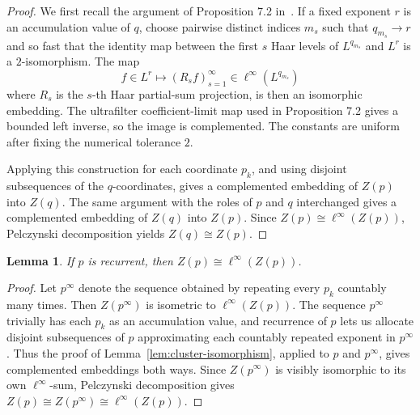\documentclass[11pt]{article}
\newtheorem{lemma}{Lemma}
\begin{document}
\begin{proof}
We first recall the argument of Proposition 7.2 in~\cite{LMMMS}.  If a fixed exponent \(r\) is an
accumulation value of \(q\), choose pairwise distinct indices \(m_s\) such that \(q_{m_s}\to r\) and
so fast that the identity map between the first \(s\) Haar levels of \(L^{q_{m_s}}\) and
\(L^r\) is a \(2\)-isomorphism.  The map
\[
  f\in L^r \longmapsto (R_s f)_{s=1}^\infty\in\ell^\infty(L^{q_{m_s}})
\]
where \(R_s\) is the \(s\)-th Haar partial-sum projection, is then an isomorphic embedding.  The
ultrafilter coefficient-limit map used in Proposition 7.2 gives a bounded left inverse, so the
image is complemented.  The constants are uniform after fixing the numerical tolerance \(2\).

Applying this construction for each coordinate \(p_k\), and using disjoint subsequences of the
\(q\)-coordinates, gives a complemented embedding of \(Z(p)\) into \(Z(q)\).  The same argument with
the roles of \(p\) and \(q\) interchanged gives a complemented embedding of \(Z(q)\) into \(Z(p)\).
Since \(Z(p)\cong\ell^\infty(Z(p))\), Pelczynski decomposition yields \(Z(q)\cong Z(p)\).
\end{proof}

\begin{lemma}
\label{lem:recurrent-accordion}
If \(p\) is recurrent, then \(Z(p)\cong\ell^\infty(Z(p))\).
\end{lemma}

\begin{proof}
Let \(p^\infty\) denote the sequence obtained by repeating every \(p_k\) countably many times.  Then
\(Z(p^\infty)\) is isometric to \(\ell^\infty(Z(p))\).  The sequence \(p^\infty\) trivially has each
\(p_k\) as an accumulation value, and recurrence of \(p\) lets us allocate disjoint subsequences of
\(p\) approximating each countably repeated exponent in \(p^\infty\).  Thus the proof of
Lemma~\ref{lem:cluster-isomorphism}, applied to \(p\) and \(p^\infty\), gives complemented
embeddings both ways.  Since \(Z(p^\infty)\) is visibly isomorphic to its own \(\ell^\infty\)-sum,
Pelczynski decomposition gives \(Z(p)\cong Z(p^\infty)\cong \ell^\infty(Z(p))\).
\end{proof}
\end{document}
